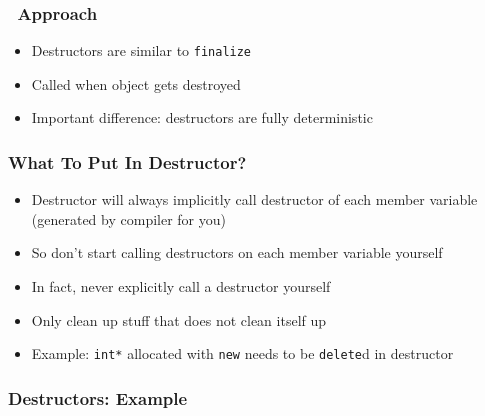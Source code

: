 \begin{frame}
  \frametitle{\cpp\ Approach}
  \begin{itemize}
    \item Destructors are similar to {\tt finalize}
    \item Called when object gets destroyed
    \item Important difference: destructors are fully deterministic
  \end{itemize}
  \vskip5mm
  \begin{overprint}



  \end{overprint}
\end{frame}

\begin{frame}
  \frametitle{What To Put In Destructor?}
  \begin{itemize}
    \item Destructor will always implicitly call destructor of each member variable
          (generated by compiler for you)
    \item So don't start calling destructors on each member variable yourself
    \item In fact, never explicitly call a destructor yourself
    \item Only clean up stuff that does not clean itself up
    \item Example: {\tt int*} allocated with {\tt new} needs to be {\tt delete}d in destructor
  \end{itemize}
\end{frame}

\begin{frame}
  \frametitle{Destructors: Example}
\end{frame}


